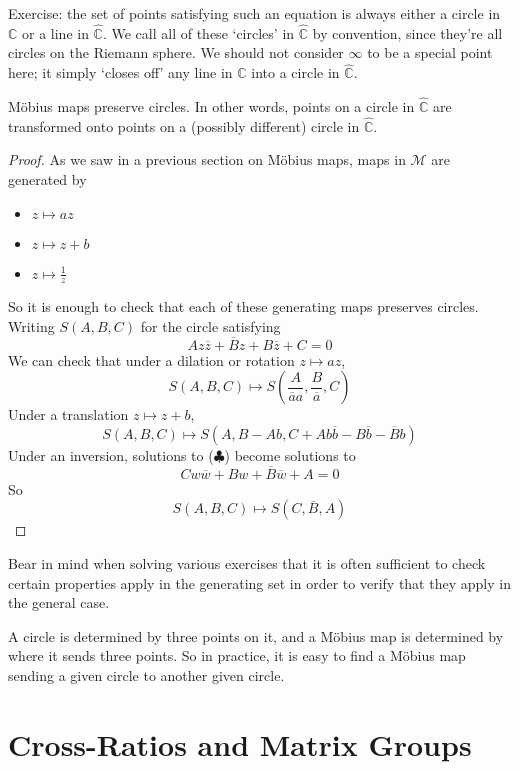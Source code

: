 \documentclass{article}
\begin{document}
Exercise: the set of points satisfying such an equation is always either a circle in $\mathbb C$ or a line in $\hat{\mathbb C}$. We call all of these `circles' in $\hat{\mathbb C}$ by convention, since they're all circles on the Riemann sphere. We should not consider $\infty$ to be a special point here; it simply `closes off' any line in $\mathbb C$ into a circle in $\hat{\mathbb C}$.

\begin{theorem}
    M\"obius maps preserve circles. In other words, points on a circle in $\hat{\mathbb C}$ are transformed onto points on a (possibly different) circle in $\hat{\mathbb C}$.
\end{theorem}
\begin{proof}
    As we saw in a previous section on M\"obius maps, maps in $\mathcal M$ are generated by
    \begin{itemize}
        \item $z \mapsto az$
        \item $z \mapsto z + b$
        \item $z \mapsto \frac{1}{z}$
    \end{itemize}
    So it is enough to check that each of these generating maps preserves circles. Writing $S(A, B, C)$ for the circle satisfying
    \[ Az\overline z + \overline B z + B \overline z + C = 0 \tag{$\clubsuit$} \]
    We can check that under a dilation or rotation $z \mapsto az$,
    \[ S(A, B, C) \mapsto S\left( \frac{A}{\overline a a}, \frac{B}{\overline a}, C \right) \]
    Under a translation $z \mapsto z + b$,
    \[ S(A, B, C) \mapsto S\left( A, B-Ab, C+Ab\overline b - B\overline b - \overline B b \right) \]
    Under an inversion, solutions to ($\clubsuit$) become solutions to
    \[ Cw\overline w + Bw + \overline B\overline w + A = 0 \]
    So
    \[ S(A, B, C) \mapsto S(C, \overline B, A) \]
\end{proof}
Bear in mind when solving various exercises that it is often sufficient to check certain properties apply in the generating set in order to verify that they apply in the general case.

\begin{remark}
    A circle is determined by three points on it, and a M\"obius map is determined by where it sends three points. So in practice, it is easy to find a M\"obius map sending a given circle to another given circle.
\end{remark}

\section{Cross-Ratios and Matrix Groups}
\end{document}
